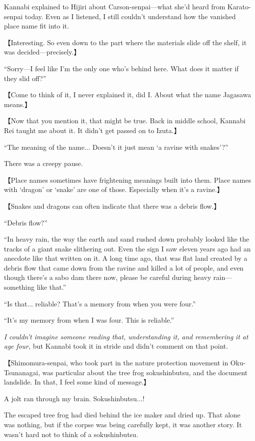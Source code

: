 \documentclass[
    a4paper,
    12pt,
    twoside,
    openany,
    UTF8,
    fontset=windows
]{ctexbook}
\begin{document}
Kannabi explained to Hijiri about Carson-senpai---what she'd heard from Karato-senpai today. Even as I listened, I still couldn't understand how the vanished place name fit into it.

【Interesting. So even down to the part where the materials slide off the shelf, it was decided---precisely.】

``Sorry---I feel like I'm the only one who's behind here. What does it matter if they slid off?''

【Come to think of it, I never explained it, did I. About what the name Jagasawa means.】

【Now that you mention it, that might be true. Back in middle school, Kannabi Rei taught me about it. It didn't get passed on to Izuta.】

``The meaning of the name... Doesn't it just mean `a ravine with snakes'?''

There was a creepy pause.

【Place names sometimes have frightening meanings built into them. Place names with `dragon' or `snake' are one of those. Especially when it's a ravine.】

【Snakes and dragons can often indicate that there was a debris flow.】

``Debris flow?''

``In heavy rain, the way the earth and sand rushed down probably looked like the tracks of a giant snake slithering out. Even the sign I saw eleven years ago had an anecdote like that written on it. A long time ago, that was flat land created by a debris flow that came down from the ravine and killed a lot of people, and even though there's a sabo dam there now, please be careful during heavy rain---something like that.''

``Is that... reliable? That's a memory from when you were four.''

``It's my memory from when I was four. This is reliable.''

\textit{I couldn't imagine someone reading that, understanding it, and remembering it at age four,} but Kannabi took it in stride and didn't comment on that point.

【Shimomura-senpai, who took part in the nature protection movement in Oku-Tsunanagai, was particular about the tree frog sokushinbutsu, and the document landslide. In that, I feel some kind of message.】

A jolt ran through my brain. Sokushinbutsu...!

The escaped tree frog had died behind the ice maker and dried up. That alone was nothing, but if the corpse was being carefully kept, it was another story. It wasn't hard not to think of a sokushinbutsu.
\end{document}
